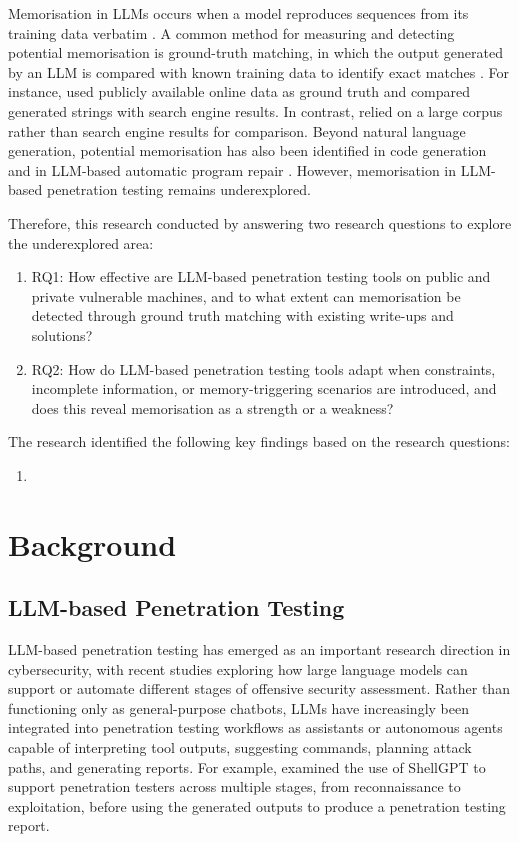 \documentclass[acmtog]{acmart}
\begin{document}
Memorisation in LLMs occurs when a model reproduces sequences from its training data verbatim \cite{biderman_emergent_2023}. A common method for measuring and detecting potential memorisation is ground-truth matching, in which the output generated by an LLM is compared with known training data to identify exact matches \cite{carlini_secret_2019,carlini_extracting_2021}. For instance, \citet{carlini_extracting_2021} used publicly available online data as ground truth and compared generated strings with search engine results. In contrast, \citet{nasr_scalable_2023} relied on a large corpus rather than search engine results for comparison. Beyond natural language generation, potential memorisation has also been identified in code generation \cite{chen_memorize_2025} and in LLM-based automatic program repair \cite{kong_demystifying_2025}. However, memorisation in LLM-based penetration testing remains underexplored.

Therefore, this research conducted by answering two research questions to explore the underexplored area:
\begin{enumerate}
    \item RQ1: How effective are LLM-based penetration testing tools on public and private vulnerable machines, and to what extent can memorisation be detected through ground truth matching with existing write-ups and solutions?
    \item RQ2: How do LLM-based penetration testing tools adapt when constraints, incomplete information, or memory-triggering scenarios are introduced, and does this reveal memorisation as a strength or a weakness?
\end{enumerate}

The research identified the following key findings based on the research questions:
\begin{enumerate}
    \item 
\end{enumerate}

\section{Background}
\subsection{LLM-based Penetration Testing}

LLM-based penetration testing has emerged as an important research direction in cybersecurity, with recent studies exploring how large language models can support or automate different stages of offensive security assessment. Rather than functioning only as general-purpose chatbots, LLMs have increasingly been integrated into penetration testing workflows as assistants or autonomous agents capable of interpreting tool outputs, suggesting commands, planning attack paths, and generating reports. For example, \citet{hilario_generative_2024} examined the use of ShellGPT to support penetration testers across multiple stages, from reconnaissance to exploitation, before using the generated outputs to produce a penetration testing report.
\end{document}
